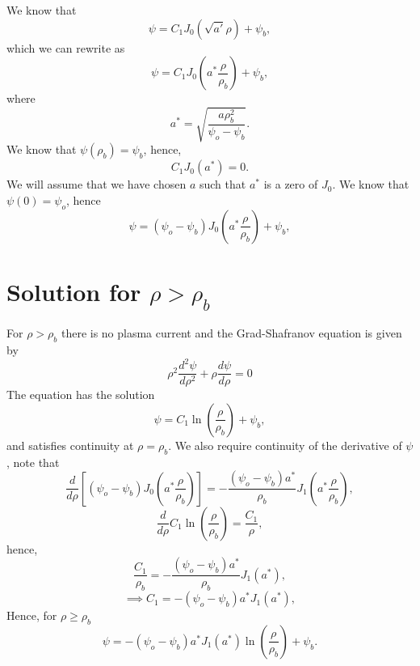 \documentclass{article}
\begin{document}
We know that
\[\psi = C_1J_0(\sqrt{a'}\rho) + \psi_b,\]
which we can rewrite as
\[\psi = C_1J_0\left(a^*\frac{\rho}{\rho_b}\right) + \psi_b,\]
where
\[a^* = \sqrt{\frac{a\rho_b^2}{\psi_o-\psi_b}}.\]
We know that $\psi(\rho_b)=\psi_b$, hence,
\[ C_1J_0(a^*)=0.\]
We will assume that we have chosen $a$ such that $a^*$ is a zero of $J_0$.
We know that $\psi(0) = \psi_o$, hence
\[\psi = (\psi_o - \psi_b)J_0\left(a^*\frac{\rho}{\rho_b}\right) + \psi_b,\]





\section{Solution for $\rho>\rho_b$}

For $\rho>\rho_b$ there is no plasma current and the Grad-Shafranov equation is given by
\[\rho^2\frac{d^2\psi}{d \rho^2} + \rho\frac{d \psi}{d \rho} = 0\]
The equation has the solution
\[\psi = C_1\ln\left(\frac{\rho}{\rho_b}\right) + \psi_b,\]
and satisfies continuity at $\rho=\rho_b$.
We also require continuity of the derivative of $\psi$, note that
\[\frac{d}{d\rho}\left[(\psi_o-\psi_b)J_0\left(a^*\frac{\rho}{\rho_b}\right)\right]=-\frac{(\psi_o-\psi_b)a^*}{\rho_b}J_1\left(a^*\frac{\rho}{\rho_b}\right),\]
\[\frac{d}{d\rho} C_1\ln\left(\frac{\rho}{\rho_b}\right) = \frac{C_1}{\rho},\]
hence,
\[\frac{C_1}{\rho_b} = -\frac{(\psi_o-\psi_b)a^*}{\rho_b}J_1(a^*),\]
\[\implies C_1 = -(\psi_o-\psi_b)a^*J_1(a^*),\]
Hence, for $\rho\ge\rho_b$
\[\psi = -(\psi_o-\psi_b)a^*J_1(a^*)\ln\left(\frac{\rho}{\rho_b}\right) + \psi_b.\]
\end{document}
